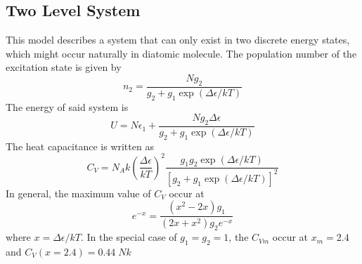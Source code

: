 \documentclass[../../../Main.tex]{subfiles}
\begin{document}
\subsection*{Two Level System}
This model describes a system that can only exist in two discrete energy states, which might occur naturally in diatomic molecule. The population number of the excitation state is given by 
\begin{equation*}
    n_2=\frac{Ng_2}{g_2+g_1\exp(\Delta\epsilon/kT)}
\end{equation*}
The energy of said system is 
\begin{equation*}
    U=N\epsilon_1+\frac{Ng_2\Delta\epsilon}{g_2+g_1\exp(\Delta\epsilon/kT)}
\end{equation*}
The heat capacitance is written as 
\begin{equation*}
    C_V=N_Ak\left(\frac{\Delta\epsilon}{kT}\right)^2\frac{g_1g_2\exp(\Delta\epsilon/kT)}{\left[g_2+g_1\exp(\Delta\epsilon/kT)\right]^2}
\end{equation*}
In general, the maximum value of $C_V$ occur at
\begin{equation*}
   e^{-x}=\frac{(x^2-2x)g_1}{(2x+x^2)g_2e^{-x}} 
\end{equation*}
where $x=\Delta\epsilon/kT$. In the special case of $g_1=g_2=1$, the $C_{Vm}$ occur at $x_m=2.4$ and $C_V(x=2.4)=0.44\;Nk$
\end{document}
